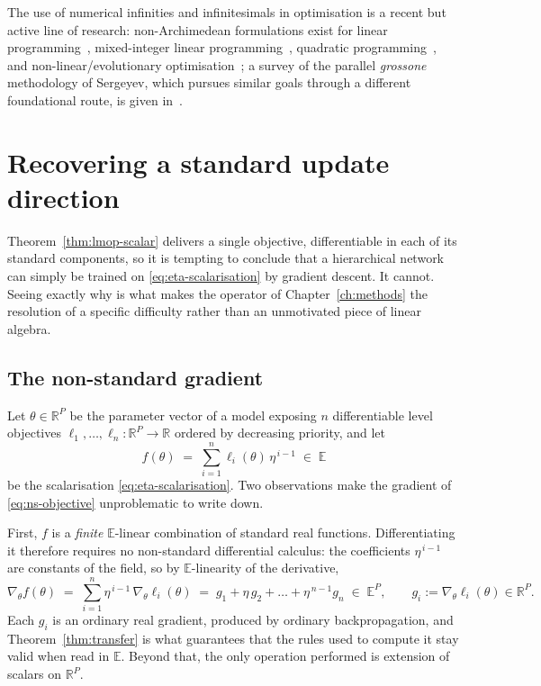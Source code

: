 The use of numerical infinities and infinitesimals in optimisation is a recent but
active line of research: non-Archimedean formulations exist for linear
programming~\cite{cococcioni2018lexicographic},
mixed-integer linear programming~\cite{cococcioni2020solving}, quadratic
programming~\cite{fiaschi2022nonarchimedean}, and non-linear/evolutionary
optimisation~\cite{lai2021solving}; a survey of the parallel \emph{grossone}
methodology of Sergeyev, which pursues similar goals through a different
foundational route, is given in~\cite{sergeyev2017numerical}.

\section{Recovering a standard update direction}
\label{sec:nsa-bridge}

Theorem~\ref{thm:lmop-scalar} delivers a single objective, differentiable in each of
its standard components, so it is tempting to conclude that a hierarchical network
can simply be trained on \eqref{eq:eta-scalarisation} by gradient descent. It cannot.
Seeing exactly why is what makes the operator of Chapter~\ref{ch:methods} the
resolution of a specific difficulty rather than an unmotivated piece of linear
algebra.

\subsection{The non-standard gradient}
\label{ssec:nsa-gradient}

Let $\theta \in \mathbb{R}^{P}$ be the parameter vector of a model exposing $n$
differentiable level objectives
$\ell_1,\dots,\ell_n : \mathbb{R}^{P} \to \mathbb{R}$ ordered by decreasing priority,
and let
\begin{equation}
  \label{eq:ns-objective}
  f(\theta) \;=\; \sum_{i=1}^{n} \ell_i(\theta)\,\eta^{\,i-1} \;\in\; \mathbb{E}
\end{equation}
be the scalarisation \eqref{eq:eta-scalarisation}. Two observations make the gradient
of \eqref{eq:ns-objective} unproblematic to write down.

First, $f$ is a \emph{finite} $\mathbb{E}$-linear combination of standard real
functions. Differentiating it therefore requires no non-standard differential
calculus: the coefficients $\eta^{\,i-1}$ are constants of the field, so by
$\mathbb{E}$-linearity of the derivative,
\begin{equation}
  \label{eq:ns-gradient}
  \nabla_\theta f(\theta)
  \;=\;
  \sum_{i=1}^{n} \eta^{\,i-1}\,\nabla_\theta \ell_i(\theta)
  \;=\;
  g_1 + \eta\,g_2 + \dots + \eta^{\,n-1} g_n
  \;\in\; \mathbb{E}^{P},
  \qquad
  g_i := \nabla_\theta \ell_i(\theta) \in \mathbb{R}^{P}.
\end{equation}
Each $g_i$ is an ordinary real gradient, produced by ordinary backpropagation, and
Theorem~\ref{thm:transfer} is what guarantees that the rules used to compute it stay
valid when read in $\mathbb{E}$. Beyond that, the only operation performed is
extension of scalars on $\mathbb{R}^{P}$.

